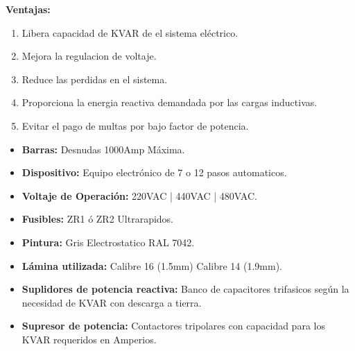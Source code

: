 \documentclass[11pt,letterpaper]{article}
\begin{document}
\begin{enumerate}
		\textbf{Ventajas:}		
		\begin{enumerate}
			\item Libera capacidad de KVAR de el sistema eléctrico.
			\item Mejora la regulacion de voltaje.
			\item Reduce las perdidas en el sistema.
			\item Proporciona la energia reactiva demandada por las cargas inductivas.
			\item Evitar el pago de multas por bajo factor de potencia.
		\end{enumerate}
		
		\begin{itemize}
			\item \textbf{Barras:} Desnudas 1000Amp Máxima.
			\item \textbf{Dispositivo:} Equipo electrónico de 7 o 12 pasos automaticos.
			\item \textbf{Voltaje de Operación:} 220VAC | 440VAC | 480VAC.
			\item \textbf{Fusibles:} ZR1 ó ZR2 Ultrarapidos.
			\item \textbf{Pintura:} Gris Electrostatico RAL 7042.
			\item \textbf{Lámina utilizada:} Calibre 16 (1.5mm) Calibre 14 (1.9mm).
			\item \textbf{Suplidores de potencia reactiva:} Banco de capacitores trifasicos según la necesidad de KVAR con descarga a tierra.
			\item \textbf{Supresor de potencia:} Contactores tripolares con capacidad para los KVAR requeridos en Amperios.
		\end{itemize}
		
\end{enumerate}
\end{document}
